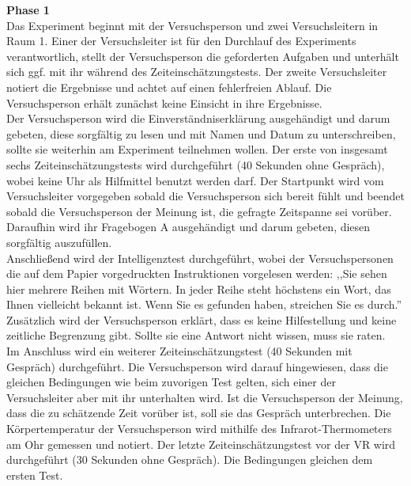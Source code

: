 \documentclass{Bericht}
\begin{document}
\textbf{Phase 1}\\
Das Experiment beginnt mit der Versuchsperson und zwei Versuchsleitern in Raum 1. Einer der Versuchsleiter ist für den Durchlauf des Experiments verantwortlich, stellt der Versuchsperson die geforderten Aufgaben und unterhält sich ggf. mit ihr während des Zeiteinschätzungstests. Der zweite Versuchsleiter notiert die Ergebnisse und achtet auf einen fehlerfreien Ablauf. Die Versuchsperson erhält zunächst keine Einsicht in ihre Ergebnisse.\\
Der Versuchsperson wird die Einverständniserklärung ausgehändigt und darum gebeten, diese sorgfältig zu lesen und mit Namen und Datum zu unterschreiben, sollte sie weiterhin am Experiment teilnehmen wollen.
Der erste von insgesamt sechs Zeiteinschätzungstests wird durchgeführt (40 Sekunden ohne Gespräch), wobei keine Uhr als Hilfmittel benutzt werden darf.
Der Startpunkt wird vom Versuchsleiter vorgegeben sobald die Versuchsperson sich bereit fühlt und beendet sobald die Versuchsperson der Meinung ist, die gefragte Zeitspanne sei vorüber.
Daraufhin wird ihr Fragebogen A ausgehändigt und darum gebeten, diesen sorgfältig auszufüllen.\\
Anschließend wird der Intelligenztest durchgeführt, wobei der Versuchspersonen die auf dem Papier vorgedruckten Instruktionen vorgelesen werden: ,,Sie sehen hier mehrere Reihen mit Wörtern. In jeder Reihe steht höchstens ein Wort, das Ihnen vielleicht bekannt ist. Wenn Sie es gefunden haben, streichen Sie es durch.'' Zusätzlich wird der Versuchsperson erklärt, dass es keine Hilfestellung und keine zeitliche Begrenzung gibt. Sollte sie eine Antwort nicht wissen, muss sie raten.\\
Im Anschluss wird ein weiterer Zeiteinschätzungstest  (40 Sekunden mit Gespräch) durchgeführt. Die Versuchsperson wird darauf hingewiesen, dass die gleichen Bedingungen wie beim zuvorigen Test gelten, sich einer der Versuchsleiter aber mit ihr unterhalten wird. Ist die Versuchsperson der Meinung, dass die zu schätzende Zeit vorüber ist, soll sie das Gespräch unterbrechen. Die Körpertemperatur der Versuchsperson wird mithilfe des Infrarot-Thermometers am Ohr gemessen und notiert. Der letzte Zeiteinschätzungstest vor der VR wird durchgeführt (30 Sekunden ohne Gespräch). Die Bedingungen gleichen dem ersten Test.
\end{document}
